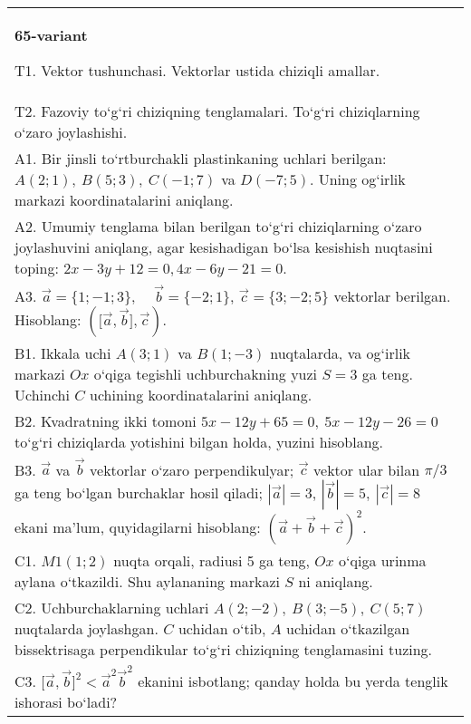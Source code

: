 \documentclass{article}
\begin{document}
\begin{tabular}{m{17cm}}
\textbf{65-variant}
\newline

T1. 
Vektor tushunchasi. Vektorlar ustida chiziqli amallar.
 \\
T2. 
Fazoviy to‘g‘ri chiziqning tenglamalari. To‘g‘ri chiziqlarning o‘zaro joylashishi.
 \\
A1. 
Bir jinsli to‘rtburchakli plastinkaning uchlari berilgan:
$A (2;1), \ B (5;3), \ C (-1;7) $ va $D (-7;5) $. Uning og‘irlik markazi
koordinatalarini aniqlang.
 \\
A2. 
Umumiy tenglama bilan berilgan to‘g‘ri chiziqlarning
o‘zaro joylashuvini aniqlang, agar kesishadigan bo‘lsa kesishish nuqtasini
toping: $2x-3y+12=0, 4x-6y-21=0$.
 \\
A3. 
$\overrightarrow{a}
= \{ 1; - 1;3\}, \ \ \ \ \ \overrightarrow{b} = \{ - 2;1\}$, $\overrightarrow{c} = \{3; -2;5\}$ vektorlar berilgan. Hisoblang:
$ (\lbrack\overrightarrow{a},\overrightarrow{b}\rbrack,\overrightarrow{c}) $.
 \\
B1. 
Ikkala uchi \(A (3;1) \) va \(B (1;-3) \) nuqtalarda, va
og‘irlik markazi $Ox$ o‘qiga tegishli uchburchakning yuzi
\(S=3\) ga teng. Uchinchi $C$ uchining koordinatalarini aniqlang. \\
B2. 
Kvadratning ikki tomoni
\(5x-12y+65=0,\ 5x-12y-26=0\) to‘g‘ri chiziqlarda
yotishini bilgan holda, yuzini hisoblang.
 \\
B3. 
$\vec{a}$ va $\vec{b}$ vektorlar o‘zaro perpendikulyar; $\vec{c}$ vektor ular bilan $\pi/3$ ga teng bo‘lgan burchaklar hosil qiladi; $|\vec{a}| = 3$, $|\vec{b}| = 5,\ |\vec{c}| = 8$ ekani ma’lum, quyidagilarni hisoblang:
$ (\vec{a} + \vec{b} + \vec{c}) ^{2}$.
 \\
C1. 
\(M{1} (1; 2) \) nuqta orqali, radiusi 5 ga teng,
$Ox$ o‘qiga urinma aylana o‘tkazildi. Shu aylananing markazi
$S$ ni aniqlang.
 \\
C2. 
Uchburchaklarning uchlari
\(A (2; - 2),\ B (3; - 5),\ C (5;7) \) nuqtalarda joylashgan. $C$
uchidan o‘tib, $A$ uchidan o‘tkazilgan bissektrisaga
perpendikular to‘g‘ri chiziqning tenglamasini tuzing.
 \\
C3. 
\(\lbrack\vec{a},\vec{b}\rbrack^{2} < {\vec{a}}^{2}{\vec{b}}^{2}\) ekanini isbotlang; qanday holda bu yerda tenglik ishorasi bo‘ladi?
 \\

\end{tabular}
\vspace{1cm}
\end{document}
